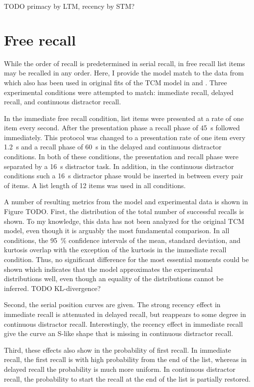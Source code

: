 TODO primacy by LTM, recency by STM\@?


\section{Free recall}
While the order of recall is predetermined in serial recall, in free recall list items may be recalled in any order.
Here, I provide the model match to the data from \textcite{Howard1999} which also has been used in original fits of the TCM model in \textcite{Howard2002} and \textcite{Sederberg2008}.
Three experimental conditions were attempted to match: immediate recall, delayed recall, and continuous distractor recall.

In the immediate free recall condition, list items were presented at a rate of one item every second.
After the presentation phase a recall phase of \SI{45}{\second} followed immediately.
This protocol was changed to a presentation rate of one item every \SI{1.2}{\second} and a recall phase of \SI{60}{\second} in the delayed and continuous distractor conditions.
In both of these conditions, the presentation and recall phase were separated by a \SI{16}{\second} distractor task.
In addition, in the continuous distractor conditions such a \SI{16}{\second} distractor phase would be inserted in between every pair of items.
A list length of 12 items was used in all conditions.

A number of resulting metrics from the model and experimental data is shown in Figure TODO\@.
First, the distribution of the total number of successful recalls is shown.
To my knowledge, this data has not been analyzed for the original TCM model, even though it is arguably the most fundamental comparison.
In all conditions, the \SI{95}{\percent} confidence intervals of the mean, standard deviation, and kurtosis overlap with the exception of the kurtosis in the immediate recall condition.
Thus, no significant difference for the most essential moments could be shown which indicates that the model approximates the experimental distributions well, even though an equality of the distributions cannot be inferred.
TODO KL-divergence?

Second, the serial position curves are given.
The strong recency effect in immediate recall is attenuated in delayed recall, but reappears to some degree in continuous distractor recall.
Interestingly, the recency effect in immediate recall give the curve an S-like shape that is missing in continuous distractor recall.

Third, these effects also show in the probability of first recall.
In immediate recall, the first recall is with high probability from the end of the list, whereas in delayed recall the probability is much more uniform.
In continuous distractor recall, the probability to start the recall at the end of the list is partially restored.

